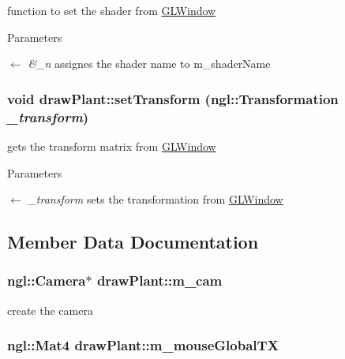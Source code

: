 function to set the shader from \hyperlink{classGLWindow}{GLWindow} 
\begin{DoxyParams}{Parameters}
\item[\mbox{$\leftarrow$} {\em \&\_\-n}]assignes the shader name to m\_\-shaderName \end{DoxyParams}
\hypertarget{classdrawPlant_a09fd9b02587d3bd6c9a3e5d358618cac}{
\subsubsection[{setTransform}]{\setlength{\rightskip}{0pt plus 5cm}void drawPlant::setTransform (ngl::Transformation {\em \_\-transform})}}
\label{classdrawPlant_a09fd9b02587d3bd6c9a3e5d358618cac}


gets the transform matrix from \hyperlink{classGLWindow}{GLWindow} 
\begin{DoxyParams}{Parameters}
\item[\mbox{$\leftarrow$} {\em \_\-transform}]sets the transformation from \hyperlink{classGLWindow}{GLWindow} \end{DoxyParams}


\subsection{Member Data Documentation}
\hypertarget{classdrawPlant_a7df5109e180023ac117c8a84d7976c8f}{
\subsubsection[{m\_\-cam}]{\setlength{\rightskip}{0pt plus 5cm}ngl::Camera$\ast$ {\bf drawPlant::m\_\-cam}}}
\label{classdrawPlant_a7df5109e180023ac117c8a84d7976c8f}


create the camera \hypertarget{classdrawPlant_aa2f75ddd1c6678f303a98d55d29b98da}{
\subsubsection[{m\_\-mouseGlobalTX}]{\setlength{\rightskip}{0pt plus 5cm}ngl::Mat4 {\bf drawPlant::m\_\-mouseGlobalTX}}}
\label{classdrawPlant_aa2f75ddd1c6678f303a98d55d29b98da}


